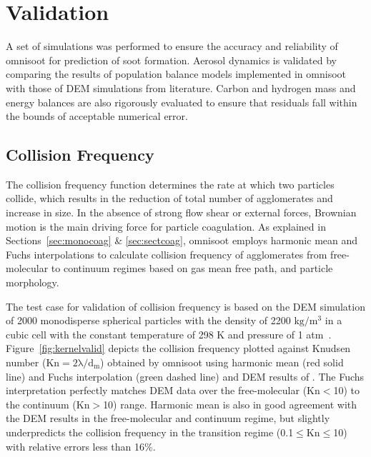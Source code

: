 \section{Validation}
A set of simulations was performed to ensure the accuracy and reliability of omnisoot for prediction of soot formation. Aerosol dynamics is validated by comparing the results of population balance models implemented in omnisoot with those of DEM simulations from literature. Carbon and hydrogen mass and energy balances are also rigorously evaluated to ensure that residuals fall within the bounds of acceptable numerical error.

\subsection{Collision Frequency}
The collision frequency function determines the rate at which two particles collide, which results in the reduction of total number of agglomerates and increase in size. In the absence of strong flow shear or external forces, Brownian motion is the main driving force for particle coagulation. As explained in Sections~\ref{sec:monocoag} \& \ref{sec:sectcoag}, omnisoot employs harmonic mean and Fuchs interpolations to calculate collision frequency of agglomerates from free-molecular to continuum regimes based on gas mean free path, and particle morphology. 

The test case for validation of collision frequency is based on the DEM simulation of 2000 monodisperse spherical particles with the density of 2200 $\mathrm{kg/m^3}$ in
a cubic cell with the constant temperature of 298 K and pressure of 1 atm~\citep{goudeli2015coagulation}. Figure~\ref{fig:kernelvalid} depicts the collision frequency plotted against Knudsen number ($\mathrm{Kn=2\lambda/d_m}$) obtained by omnisoot using harmonic mean (red solid line) and Fuchs interpolation (green dashed line) and DEM results of \citet{goudeli2015coagulation}. The Fuchs interpretation perfectly matches DEM data over the free-molecular (Kn$<$10) to the continuum (Kn$>$10) range. Harmonic mean is also in good agreement with the DEM results in the free-molecular and continuum regime, but slightly underpredicts the collision frequency in the transition regime (0.1$\le$Kn$\le$10) with relative errors less than 16\%.

